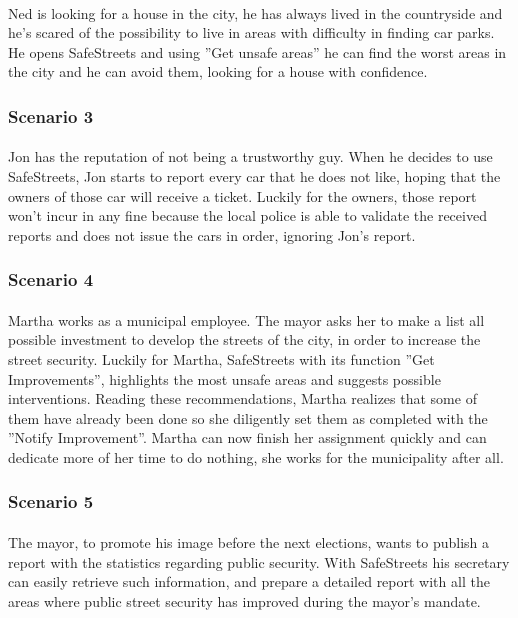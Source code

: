 					\paragraph{}
						Ned is looking for a house in the city, he has always lived in the countryside and he's scared of the possibility to live in areas with difficulty in finding car parks. He opens SafeStreets and using ''Get unsafe areas'' he can find the worst areas in the city and he can avoid them, looking for a house with confidence.
				\subsubsection{Scenario 3}
					\paragraph{}
						Jon has the reputation of not being a trustworthy guy. When he decides to use SafeStreets, Jon starts to report every car that he does not like, hoping that the owners of those car will receive a ticket. Luckily for the owners, those report won't incur in any fine because the local police is able to validate the received reports and does not issue the cars in order, ignoring Jon's report.
				\subsubsection{Scenario 4}
					\paragraph{}
						Martha works as a municipal employee. The mayor asks her to make a list all possible investment to develop the streets of the city, in order to increase the street security. Luckily for Martha, SafeStreets with its function ''Get Improvements'', highlights the most unsafe areas and suggests possible interventions. Reading these recommendations, Martha realizes that some of them have already been done so she diligently set them as completed with the ''Notify Improvement''. Martha can now finish her assignment quickly and can dedicate more of her time to do nothing, she works for the municipality after all.
				\subsubsection{Scenario 5}
					\paragraph{}
						The mayor, to promote his image before the next elections, wants to publish a report with the statistics regarding public security. With SafeStreets his secretary can easily retrieve such information, and prepare a detailed report with all the areas where public street security has improved during the mayor's mandate.

